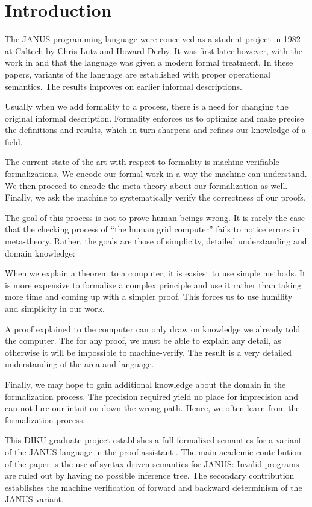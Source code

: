 \chapter{Introduction}

The JANUS programming language were conceived as a student project in
1982 at Caltech by Chris Lutz and Howard Derby. It was first later
however, with the work in \cite{glueck2007} and \cite{glueck2008} that
the language was given a modern formal treatment. In these papers, variants
of the language are established with proper operational semantics. The
results improves on earlier informal descriptions.

Usually when we add formality to a process, there is a need for
changing the original informal description. Formality enforces us to
optimize and make precise the definitions and results, which in turn
sharpens and refines our knowledge of a field.

The current state-of-the-art with respect to formality is
machine-verifiable formalizations. We encode our formal work in a way
the machine can understand. We then proceed to encode the meta-theory
about our formalization as well. Finally, we ask the machine to
systematically verify the correctness of our proofs.

The goal of this process is not to prove human beings wrong. It is
rarely the case that the checking process of ``the human grid
computer'' fails to notice errors in meta-theory. Rather, the goals
are those of simplicity, detailed understanding and domain knowledge:

When we explain a theorem to a computer, it is easiest to use simple
methods. It is more expensive to formalize a complex principle and use
it rather than taking more time and coming up with a simpler
proof. This forces us to use humility and simplicity in our work.

A proof explained to the computer can only draw on knowledge we
already told the computer. The for any proof, we must be able to
explain any detail, as otherwise it will be impossible to
machine-verify. The result is a very detailed understanding of the
area and language.

Finally, we may hope to gain additional knowledge about the domain in
the formalization process. The precision required yield no place for
imprecision and can not lure our intuition down the wrong path. Hence,
we often learn from the formalization process.

This DIKU graduate project establishes a full formalized semantics for
a variant of the JANUS language in the proof assistant \coq{}. The
main academic contribution of the paper is the use of syntax-driven
semantics for JANUS: Invalid programs are ruled out by having no possible
inference tree. The secondary contribution establishes the machine
verification of forward and backward determinism of the JANUS variant.

